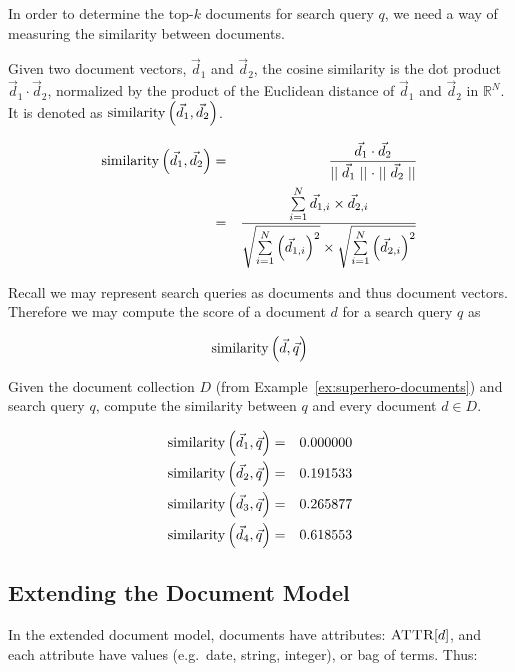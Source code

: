 		In order to determine the top-$k$ documents for search query $q$, we need a way of measuring the similarity between documents.
		
		\begin{defn}
			Given two document vectors, $\vec{d}_1$ and $\vec{d}_2$, the cosine similarity is the dot product $\vec{d}_1 \cdot \vec{d}_2$, normalized by the product of the Euclidean distance of $\vec{d}_1$ and $\vec{d}_2$ in $\mathbb{R}^N$.  It is denoted as $\operatorname{similarity}\left(\vec{d}_1, \vec{d}_2\right)$.
			
			\begin{eqnarray}
				\operatorname{similarity}\left(\vec{d}_1, \vec{d}_2\right) &=& \frac{\vec{d}_1 \cdot \vec{d}_2}{\mid\mid \vec{d}_1 \mid\mid \cdot \mid\mid \vec{d}_2 \mid\mid} \\
				 &=& \frac{\sum\limits_{i=1}^{N} \vec{d}_{1, i} \times \vec{d}_{2, i}}{\sqrt{\sum\limits_{i=1}^{N} \left(\vec{d}_{1, i}\right)^2} \times \sqrt{\sum\limits_{i=1}^{N} \left(\vec{d}_{2, i}\right)^2}}
			\end{eqnarray}
		\end{defn}
		
		Recall we may represent search queries as documents and thus document vectors.  Therefore we may compute the score of a document $d$ for a search query $q$ as
		
		$$\operatorname{similarity}\left(\vec{d}, \vec{q}\right)$$
		
		\begin{ex}
			Given the document collection $D$ (from Example~\ref{ex:superhero-documents}) and search query $q$, compute the similarity between $q$ and every document $d \in D$.
			
			\begin{eqnarray}
				\operatorname{similarity}\left(\vec{d}_1, \vec{q}\right) &=& 0.000000 \\
				\operatorname{similarity}\left(\vec{d}_2, \vec{q}\right) &=& 0.191533 \\
				\operatorname{similarity}\left(\vec{d}_3, \vec{q}\right) &=& 0.265877 \\
				\operatorname{similarity}\left(\vec{d}_4, \vec{q}\right) &=& 0.618553
			\end{eqnarray}
		\end{ex}
		
	\subsection{Extending the Document Model}
	\label{sec:extending-the-document-model}
		In the extended document model, documents have attributes: $\textsc{ATTR}\lbrack d\rbrack$, and each attribute have values (e.g.~date, string, integer), or bag of terms.  Thus:

